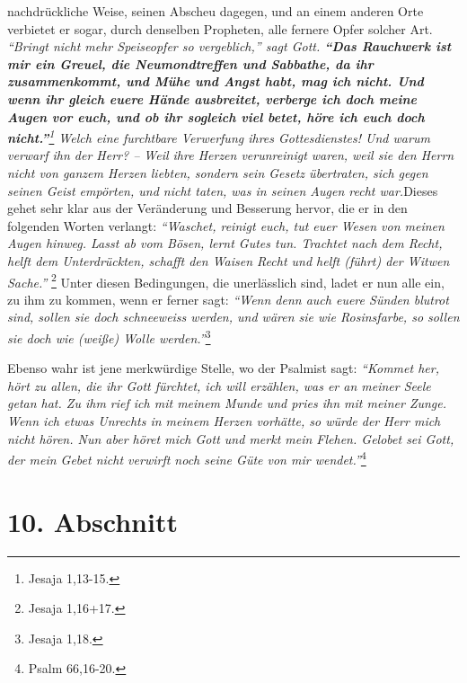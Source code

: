 nachdrückliche Weise, seinen Abscheu dagegen, und an einem anderen Orte
verbietet
er sogar, durch denselben Propheten, alle fernere Opfer solcher Art.
\textit{\textit{"`Bringt nicht mehr Speiseopfer so vergeblich,"'} sagt Gott.
\label{ref:06_09_gebetserhoerung}
\textbf{"`Das Rauchwerk ist mir ein Greuel, die Neumondtreffen und Sabbathe, da
ihr
zusammenkommt, und Mühe und Angst habt, mag ich nicht. Und wenn ihr gleich euere
Hände ausbreitet, verberge ich doch meine Augen vor euch, und ob ihr sogleich
viel
betet, höre ich euch doch nicht."'}\footnote{Jesaja
1,13-15.}
Welch eine
furchtbare Verwerfung ihres Gottesdienstes! Und warum verwarf ihn der Herr? --
Weil ihre Herzen verunreinigt waren, weil sie den Herrn nicht von ganzem Herzen
liebten, sondern sein Gesetz übertraten, sich gegen seinen Geist empörten, und
nicht taten, was in seinen Augen recht war.}Dieses gehet sehr klar aus der
Veränderung und Besserung hervor, die er in den folgenden Worten verlangt:
\textit{"`Waschet, reinigt euch, tut euer Wesen von meinen Augen hinweg. Lasst
ab vom
Bösen, lernt Gutes tun. Trachtet nach dem Recht, helft dem Unterdrückten,
schafft den Waisen Recht und helft (führt) der Witwen Sache."'}
\footnote{Jesaja 1,16+17.}
Unter diesen Bedingungen, die unerlässlich sind, ladet er nun alle ein,
zu ihm zu kommen, wenn er ferner sagt:
\textit{"`Wenn denn auch euere Sünden blutrot
sind, sollen sie doch schneeweiss werden, und wären sie wie Rosinsfarbe, so
sollen sie doch wie (weiße) Wolle werden."'}\footnote{Jesaja 1,18.}

\medskip

Ebenso wahr ist jene merkwürdige Stelle, wo der Psalmist sagt:
\textit{"`Kommet her,
hört zu allen, die ihr Gott fürchtet, ich will erzählen, was er an meiner Seele
getan hat. Zu ihm rief ich mit meinem Munde und pries ihn mit meiner Zunge.
Wenn ich etwas Unrechts in meinem Herzen vorhätte, so würde der Herr mich nicht
hören. Nun aber höret mich Gott und merkt mein Flehen. Gelobet sei Gott,
der mein Gebet nicht verwirft noch seine Güte von mir wendet."'}\footnote{Psalm
66,16-20.}

\section{10. Abschnitt} \label{kap6_ab10}

